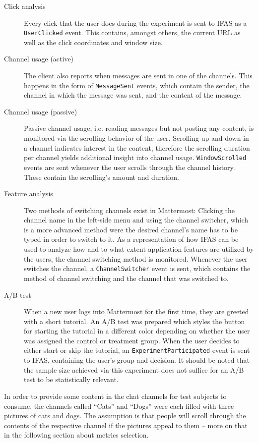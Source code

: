 \begin{description}
\label{list:cases}
\item[Click analysis]
Every click that the user does during the experiment is sent to \ac{IFAS} as a \texttt{UserClicked} event.
This contains, amongst others, the current URL as well as the click coordinates and window size.
\item[Channel usage (active)]
The client also reports when messages are sent in one of the channels.
This happens in the form of \texttt{MessageSent} events, which contain the sender, the channel in which the message was sent, and the content of the message.
\item[Channel usage (passive)]
Passive channel usage, i.e. reading messages but not posting any content, is monitored via the scrolling behavior of the user.
Scrolling up and down in a channel indicates interest in the content, therefore the scrolling duration per channel yields additional insight into channel usage.
\texttt{WindowScrolled} events are sent whenever the user scrolls through the channel history.
These contain the scrolling's amount and duration.
\item[Feature analysis]
Two methods of switching channels exist in Mattermost: Clicking the channel name in the left-side menu and using the channel switcher, which is a more advanced method were the desired channel's name has to be typed in order to switch to it.
As a representation of how \ac{IFAS} can be used to analyze how and to what extent application features are utilized by the users, the channel switching method is monitored.
Whenever the user switches the channel, a \texttt{ChannelSwitcher} event is sent, which contains the method of channel switching and the channel that was switched to.
\item[A/B test]
When a new user logs into Mattermost for the first time, they are greeted with a short tutorial.
An A/B test was prepared which styles the button for starting the tutorial in a different color depending on whether the user was assigned the control or treatment group.
When the user decides to either start or skip the tutorial, an \texttt{ExperimentParticipated} event is sent to \ac{IFAS}, containing the user's group and decision.
It should be noted that the sample size achieved via this experiment does not suffice for an A/B test to be statistically relevant.

\end{description}

In order to provide some content in the chat channels for test subjects to consume, the channels called ``Cats'' and ``Dogs'' were each filled with three pictures of cats and dogs.
The assumption is that people will scroll through the contents of the respective channel if the pictures appeal to them -- more on that in the following section about metrics selection.

